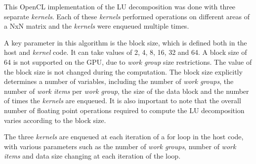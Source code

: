 \par{This OpenCL implementation of the LU decomposition was done with three 
    separate \emph{kernels}. Each of these \emph{kernels} performed operations on different 
    areas of a NxN matrix and the \emph{kernels} were enqueued multiple times.}

\par{A key parameter in this algorithm is the block size, which is defined 
    both in the host and \emph{kernel} code. It can take values of 2, 4, 8, 16, 32 
    and 64. A block size of 64 is not supported on the GPU, due to \emph{work group} 
    size restrictions. The value of the block size is not changed during the 
    computation. The block size explicitly determines a number of variables, 
    including the number of \emph{work groups}, the number of \emph{work items} per 
    \emph{work group}, the size of the data block and the number of times the 
    \emph{kernels} are enqueued. It is also important to note that the overall number of 
    floating point operations required to compute the LU decomposition varies 
    according to the block size.}


\par{The three \emph{kernels} are enqueued at each iteration of a for loop in the 
    host code, with various parameters such as the number of \emph{work groups}, 
    number of \emph{work items} and data size changing at each iteration of the 
    loop.}

